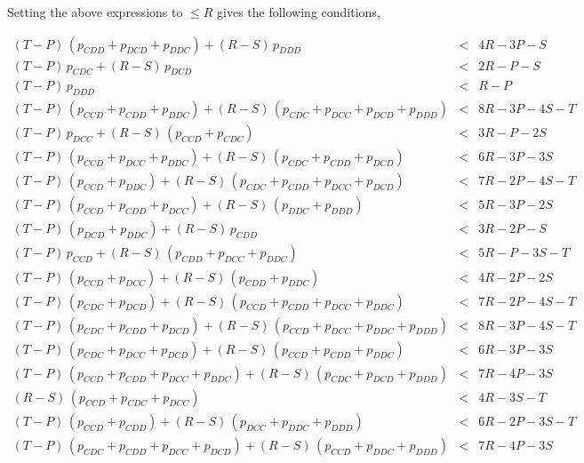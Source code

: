 \documentclass[11pt]{article}
\theoremstyle{plainCl1}
\theoremstyle{plainCl2}
\begin{document}
Setting the above expressions to $\leq R$ gives the following conditions,

\begin{equation*}
  \begin{array}{ccc}
    (T - P)\, (p_{CDD} + p_{DCD} + p_{DDC}) + (R - S)\, p_{DDD}  & < & 4 R - 3 P  - S \\ [0.2cm]
    (T - P)\, p_{CDC}  + (R - S)\, p_{DCD}  & < & 2 R - P  - S \\ [0.2cm]
    (T - P)\, p_{DDD} & < & R - P\\ [0.2cm]
    (T - P)\,(p_{CCD} + p_{CDD} + p_{DDC}) + (R - S)\,(p_{CDC} + p_{DCC} + p_{DCD} + p_{DDD}) & < & 8 R - 3 P - 4 S - T \\ [0.2cm]
    (T - P)\, p_{DCC}  + (R - S)\,(p_{CCD} + p_{CDC}) & < & 3 R - P - 2 S \\ [0.2cm]
    (T - P)\,(p_{CCD} + p_{DCC} + p_{DDC}) + (R - S)\,(p_{CDC} + p_{CDD} + p_{DCD}) & < & 6 R - 3 P - 3 S \\ [0.2cm]
    (T - P)\,(p_{CCD} + p_{DDC}) + (R - S)\,(p_{CDC} + p_{CDD} + p_{DCC} + p_{DCD}) & < & 7 R - 2 P - 4 S - T \\ [0.2cm]
    (T - P)\,(p_{CCD} + p_{CDD} + p_{DCC}) + (R - S)\,(p_{DDC} + p_{DDD}) & < & 5 R - 3 P - 2 S \\ [0.2cm]
    (T - P)\,(p_{DCD} + p_{DDC}) + (R - S)\, p_{CDD}  & < & 3 R - 2 P - S \\ [0.2cm] 
    (T - P)\, p_{CCD} + (R - S)\,(p_{CDD} + p_{DCC} + p_{DDC}) & < & 5 R - P - 3 S - T \\ [0.2cm]
    (T - P)\,(p_{CCD} + p_{DCC}) + (R - S)\,(p_{CDD} + p_{DDC}) & < & 4 R - 2 P - 2 S \\ [0.2cm]
    (T - P)\,(p_{CDC} + p_{DCD}) + (R - S)\,(p_{CCD} + p_{CDD} + p_{DCC} + p_{DDC}) & < & 7 R - 2 P - 4 S - T \\ [0.2cm]
    (T - P)\,(p_{CDC} + p_{CDD} + p_{DCD}) + (R - S)\,(p_{CCD} + p_{DCC} + p_{DDC} + p_{DDD}) & < & 8 R - 3 P - 4 S - T \\ [0.2cm]
    (T - P)\,(p_{CDC} + p_{DCC} + p_{DCD}) + (R - S)\,(p_{CCD} + p_{CDD} + p_{DDC}) & < & 6 R - 3 P - 3 S \\ [0.2cm]
    (T - P)\,(p_{CCD} + p_{CDD} + p_{DCC} + p_{DDC}) + (R - S)\,(p_{CDC} + p_{DCD} + p_{DDD}) & < & 7 R - 4 P - 3 S \\ [0.2cm]
    (R - S)\,(p_{CCD} + p_{CDC} + p_{DCC}) & < & 4 R - 3 S - T \\ [0.2cm]
    (T - P)\,(p_{CCD} + p_{CDD}) + (R - S)\,(p_{DCC} + p_{DDC} + p_{DDD}) & < & 6 R - 2 P - 3 S - T \\ [0.2cm]
    (T - P)\,(p_{CDC} + p_{CDD} + p_{DCC} + p_{DCD}) + (R - S)\,(p_{CCD} + p_{DDC} + p_{DDD}) & < & 7 R - 4 P - 3 S
    \end{array}
\end{equation*}
\end{document}
